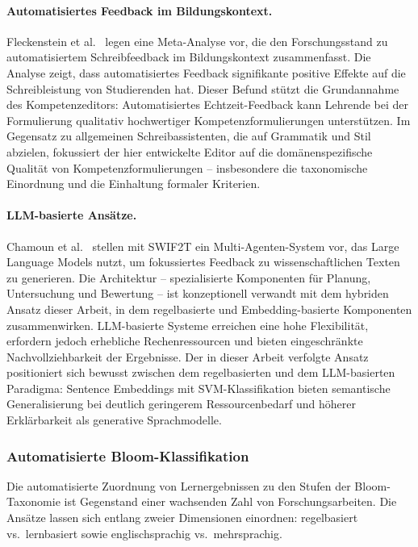 \paragraph{Automatisiertes Feedback im Bildungskontext.}

Fleckenstein et al.~\cite{fleckenstein2023automated} legen eine Meta-Analyse vor, die den Forschungsstand zu automatisiertem Schreibfeedback im Bildungskontext zusammenfasst.
Die Analyse zeigt, dass automatisiertes Feedback signifikante positive Effekte auf die Schreibleistung von Studierenden hat.
Dieser Befund stützt die Grundannahme des Kompetenzeditors: Automatisiertes Echtzeit-Feedback kann Lehrende bei der Formulierung qualitativ hochwertiger Kompetenzformulierungen unterstützen.
Im Gegensatz zu allgemeinen Schreibassistenten, die auf Grammatik und Stil abzielen, fokussiert der hier entwickelte Editor auf die domänenspezifische Qualität von Kompetenzformulierungen -- insbesondere die taxonomische Einordnung und die Einhaltung formaler Kriterien.

\paragraph{LLM-basierte Ansätze.}

Chamoun et al.~\cite{chamoun2024automated} stellen mit SWIF2T ein Multi-Agenten-System vor, das Large Language Models nutzt, um fokussiertes Feedback zu wissenschaftlichen Texten zu generieren.
Die Architektur -- spezialisierte Komponenten für Planung, Untersuchung und Bewertung -- ist konzeptionell verwandt mit dem hybriden Ansatz dieser Arbeit, in dem regelbasierte und Embedding-basierte Komponenten zusammenwirken.
LLM-basierte Systeme erreichen eine hohe Flexibilität, erfordern jedoch erhebliche Rechenressourcen und bieten eingeschränkte Nachvollziehbarkeit der Ergebnisse.
Der in dieser Arbeit verfolgte Ansatz positioniert sich bewusst zwischen dem regelbasierten und dem LLM-basierten Paradigma: Sentence Embeddings mit SVM-Klassifikation bieten semantische Generalisierung bei deutlich geringerem Ressourcenbedarf und höherer Erklärbarkeit als generative Sprachmodelle.

\subsubsection{Automatisierte Bloom-Klassifikation}\label{sec:relwork-bloom}

Die automatisierte Zuordnung von Lernergebnissen zu den Stufen der Bloom-Taxonomie ist Gegenstand einer wachsenden Zahl von Forschungsarbeiten.
Die Ansätze lassen sich entlang zweier Dimensionen einordnen: regelbasiert vs.\ lernbasiert sowie englischsprachig vs.\ mehrsprachig.

